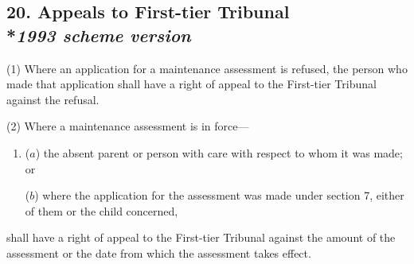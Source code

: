 \documentclass[12pt,a4paper]{article}
\begin{document}
%
%
%
%
%
%
%
%
%
%
%
%
%
%

\subsection[20. Appeals to 
First-tier Tribunal  %
--- \emph{1993 scheme version}]{20. Appeals to 
First-tier Tribunal%
\\*\emph{1993 scheme version}}

(1) Where an application for a maintenance assessment is refused, the person who made that application shall have a right of appeal to 
the First-tier Tribunal  %
against the refusal.

(2) Where a maintenance assessment is in force—
\begin{enumerate}\item[]
($a$) the absent parent or person with care with respect to whom it was made; or

($b$) where the application for the assessment was made under section 7, either of them or the child concerned,
\end{enumerate}
shall have a right of appeal to 
the First-tier Tribunal  %
against the amount of the assessment or the date from which the assessment takes effect.
\end{document}
